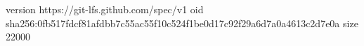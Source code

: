 version https://git-lfs.github.com/spec/v1
oid sha256:0fb517fdcf81afdbb7c55ac55f10c524f1be0d17c92f29a6d7a0a4613c2d7e0a
size 22000
